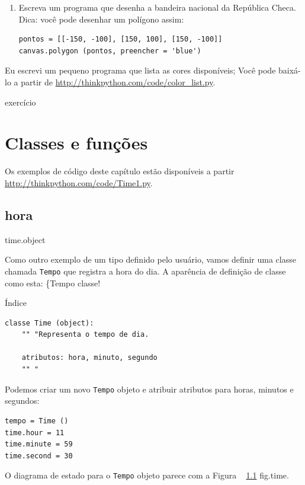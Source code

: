 \documentclass[10pt]{book}
\begin{document}
\begin{v erbatim}
{\begin{}
\begin{enumerate}
\item Escreva um programa que desenha a bandeira nacional da República Checa.
Dica: você pode desenhar um polígono assim:

\begin{verbatim}
pontos = [[-150, -100], [150, 100], [150, -100]]
canvas.polygon (pontos, preencher = 'blue')
\end{verbatim}

\end{enumerate}

Eu escrevi um pequeno programa que lista as cores disponíveis;
Você pode baixá-lo a partir de \url{http://thinkpython.com/code/color_list.py}.

\end{} exercício


\chapter{Classes e funções}
\label{tempo}

Os exemplos de código deste capítulo estão disponíveis a partir
\url{http://thinkpython.com/code/Time1.py}.

\section{hora}
\label{} time.object

Como outro exemplo de um tipo definido pelo usuário, vamos definir uma classe chamada
{\tt Tempo} que registra a hora do dia. A aparência de definição de classe
como esta:
\{Tempo classe!} Índice

\begin{verbatim}
classe Time (object):
    "" "Representa o tempo de dia.
       
    atributos: hora, minuto, segundo
    "" "
\end{verbatim}
%
Podemos criar um novo {\tt Tempo} objeto e atribuir
atributos para horas, minutos e segundos:

\begin{verbatim}
tempo = Time ()
time.hour = 11
time.minute = 59
time.second = 30
\end{verbatim}
%
O diagrama de estado para o {\tt Tempo} objeto parece com a Figura ~ \ref {} fig.time.


\end{v erbatim}
\end{document}
